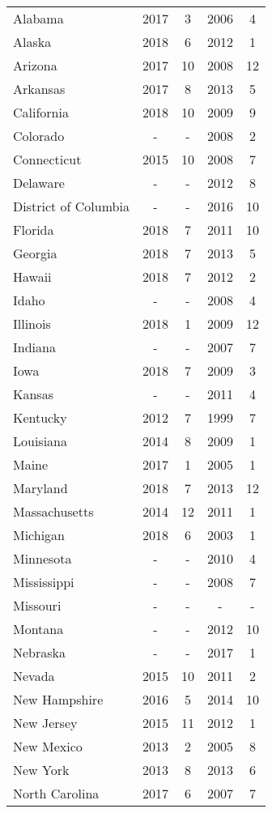 \documentclass[12pt,a4paper]{article}
\begin{document}
\begin{longtable}[c]{lcccc}
    Alabama & 2017 & 3 & 2006 & 4 \\
    Alaska & 2018 & 6 & 2012 & 1 \\
    Arizona & 2017 & 10 & 2008 & 12 \\
    Arkansas & 2017 & 8 & 2013 & 5 \\
    California & 2018 & 10 & 2009 & 9 \\
    Colorado & - & - & 2008 & 2 \\
    Connecticut & 2015 & 10 & 2008 & 7 \\
    Delaware & - & - & 2012 & 8 \\
    District of Columbia & - & - & 2016 & 10 \\
    Florida & 2018 & 7 & 2011 & 10 \\
    Georgia & 2018 & 7 & 2013 & 5 \\
    Hawaii & 2018 & 7 & 2012 & 2 \\
    Idaho & - & - & 2008 & 4 \\
    Illinois & 2018 & 1 & 2009 & 12 \\
    Indiana & - & - & 2007 & 7 \\
    Iowa & 2018 & 7 & 2009 & 3 \\
    Kansas & - & - & 2011 & 4 \\
    Kentucky & 2012 & 7 & 1999 & 7 \\
    Louisiana & 2014 & 8 & 2009 & 1 \\
    Maine & 2017 & 1 & 2005 & 1 \\
    Maryland & 2018 & 7 & 2013 & 12 \\
    Massachusetts & 2014 & 12 & 2011 & 1 \\
    Michigan & 2018 & 6 & 2003 & 1 \\
    Minnesota & - & - & 2010 & 4 \\
    Mississippi & - & - & 2008 & 7 \\
    Missouri & - & - & - & - \\
    Montana & - & - & 2012 & 10 \\
    Nebraska & - & - & 2017 & 1 \\
    Nevada & 2015 & 10 & 2011 & 2 \\
    New Hampshire & 2016 & 5 & 2014 & 10 \\
    New Jersey & 2015 & 11 & 2012 & 1 \\
    New Mexico & 2013 & 2 & 2005 & 8 \\
    New York & 2013 & 8 & 2013 & 6 \\
    North Carolina & 2017 & 6 & 2007 & 7 \\

\end{longtable}
\end{document}
